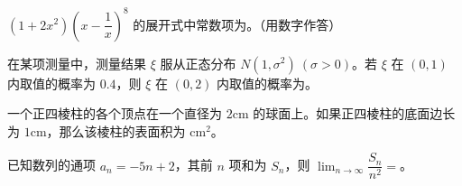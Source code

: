 \begin{question}
$(1+2x^2)\left(x-\dfrac1x\right)^8$ 的展开式中常数项为\gkblank{}。（用数字作答）

\end{question}
\begin{question}
在某项测量中，测量结果 $\xi$ 服从正态分布 $N(1,\sigma^2)\ (\sigma>0)$。若 $\xi$ 在 $(0,1)$ 内取值的概率为 $0.4$，则 $\xi$ 在 $(0,2)$ 内取值的概率为\gkblank{}。

\end{question}
\begin{question}
一个正四棱柱的各个顶点在一个直径为 $2\mathrm{cm}$ 的球面上。如果正四棱柱的底面边长为 $1\mathrm{cm}$，那么该棱柱的表面积为\gkblank{} $\mathrm{cm}^2$。

\end{question}
\begin{question}
已知数列的通项 $a_n=-5n+2$，其前 $n$ 项和为 $S_n$，则 $\displaystyle\lim_{n\to\infty}\dfrac{S_n}{n^2}=$\gkblank{}。

\end{question}

